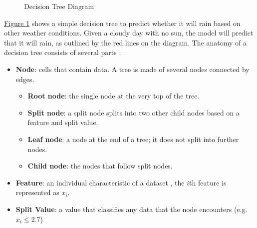 \documentclass[12pt]{article}
\begin{document}
\begin{figure}[H]
    \centering
    \caption{Decision Tree Diagram}
    \label{fig:decisiontree}
\end{figure}

\hyperref[fig:decisiontree]{Figure 1} shows a simple decision tree to predict whether it will rain based on other weather conditions. Given a cloudy day with no sun, the model will predict that it will rain, as outlined by the red lines on the diagram. The anatomy of a decision tree consists of several parts \cite{dt_skl_doc}:

\begin{itemize}
    \item \textbf{Node}: cells that contain data. A tree is made of several nodes connected by edges.
    \begin{itemize}
        \item \textbf{Root node}: the single node at the very top of the tree.
        \item \textbf{Split node}: a split node splits into two other child nodes based on a feature and split value.
        \item \textbf{Leaf node}: a node at the end of a tree; it does not split into further nodes.
        \item \textbf{Child node}: the nodes that follow split nodes.
    \end{itemize}
    \item \textbf{Feature}: an individual characteristic of a dataset \cite{pattern_recognition_ml}, the $i$th feature is represented as $x_i$.
    \item \textbf{Split Value}: a value that classifies any data that the node encounters (e.g. $x_i \le2.7$)
\end{itemize}
\end{document}
